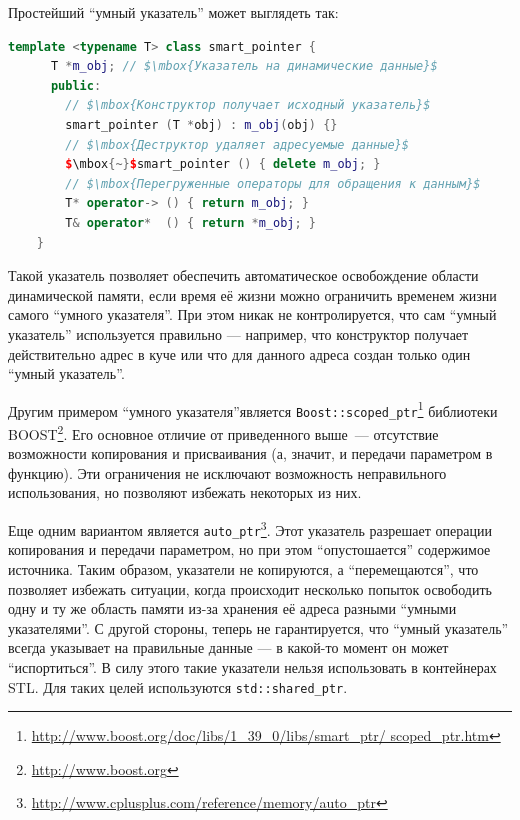 Простейший ``умный указатель'' может выглядеть так:

\begin{lstlisting}[language=C++,mathescape=true]
    template <typename T> class smart_pointer {
      T *m_obj; // $\mbox{Указатель на динамические данные}$
      public:
        // $\mbox{Конструктор получает исходный указатель}$
        smart_pointer (T *obj) : m_obj(obj) {}
        // $\mbox{Деструктор удаляет адресуемые данные}$
        $\mbox{~}$smart_pointer () { delete m_obj; }
        // $\mbox{Перегруженные операторы для обращения к данным}$
        T* operator-> () { return m_obj; }
        T& operator*  () { return *m_obj; }
    }
\end{lstlisting}

Такой указатель позволяет обеспечить автоматическое освобождение области динамической памяти, если 
время её жизни можно ограничить временем жизни самого ``умного указателя''. При этом никак не
контролируется, что сам ``умный указатель'' используется правильно --- например, что конструктор
получает действительно адрес в куче или что для данного адреса создан только один ``умный указатель''.

Другим примером ``умного указателя''является \lstinline{Boost::scoped_ptr}\footnote{\url{http://www.boost.org/doc/libs/1\_39\_0/libs/smart\_ptr/
scoped\_ptr.htm}} 
библиотеки BOOST\footnote{\url{http://www.boost.org}}. Его основное отличие от приведенного выше~--- отсутствие возможности копирования и присваивания (а,
значит, и передачи параметром в функцию). Эти ограничения не исключают возможность неправильного использования, но позволяют избежать некоторых из них.

Еще одним вариантом является \lstinline{auto_ptr}\footnote{\url{http://www.cplusplus.com/reference/memory/auto\_ptr}}. Этот указатель разрешает
операции копирования и передачи параметром, но при этом ``опустошается'' содержимое источника. Таким образом, указатели не копируются, 
а ``перемещаются'', что позволяет избежать ситуации, когда происходит несколько попыток освободить одну и ту же область памяти из-за хранения 
её адреса разными ``умными указателями''. С другой стороны, теперь не гарантируется, что ``умный указатель'' всегда указывает на правильные данные ---
в какой-то момент он может ``испортиться''. В силу этого такие указатели нельзя использовать в контейнерах STL. Для таких целей используются
\lstinline{std::shared_ptr}.

